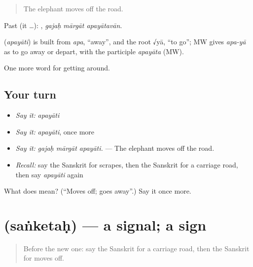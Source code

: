 \begin{quote}
The elephant moves off the road.
\end{quote}

Past (it …):   , \emph{gajaḥ mārgāt apayātavān}.

\begin{cousinweb}
\textbf{} (\emph{apayāti}) is built from \emph{apa}, \textquotedblleft{}away\textquotedblright{}, and the root √yā, \textquotedblleft{}to go\textquotedblright{}; MW gives \emph{apa-yā} as to go away or depart, with the participle \emph{apayāta} (MW).
\end{cousinweb}

\begin{grammarlens}[title={What you've built}]
One more word for getting around.
\end{grammarlens}

\subsection*{Your turn}
\begin{itemize}
\raggedright
  \item \emph{Say it:} \emph{apayāti}
  \item \emph{Say it:} \emph{apayāti}, once more
  \item \emph{Say it:} \emph{gajaḥ mārgāt apayāti.} — The elephant moves off the road.
  \item \emph{Recall:} say the Sanskrit for scrapes, then the Sanskrit for a carriage road, then say \emph{apayāti} again
\end{itemize}

\begin{tcolorbox}[breakable,colback=teal!4,colframe=teal!35!black,title={Before you move on}]
What does  mean? (\textquotedblleft{}Moves off; goes away\textquotedblright{}.) Say it once more.
\end{tcolorbox}
\section[\texorpdfstring{\sk{संकेतः} (saṅketaḥ)}{संकेतः (saṅketaḥ)}]{ (saṅketaḥ) — a signal; a sign}

\label{lesson:SA-C411-sanketah}



\begin{quote}
Before the new one: say the Sanskrit for a carriage road, then the Sanskrit for moves off.
\end{quote}

